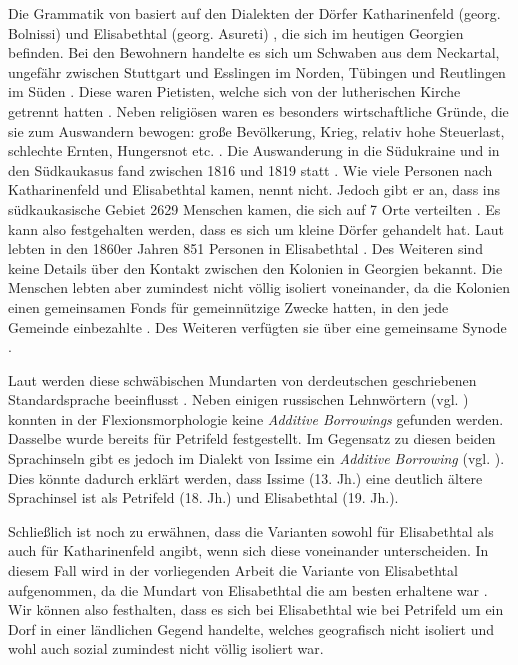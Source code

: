 Die Grammatik von \citet{Žirmunskij1928/29} basiert auf den Dialekten der Dörfer Katharinenfeld (georg. Bolnissi) und Elisabethtal (georg. Asureti) \citep[38]{Žirmunskij1928/29}, die sich im heutigen Georgien befinden. Bei den Bewohnern handelte es sich um Schwaben aus dem Neckartal, ungefähr zwischen Stuttgart und Esslingen im Norden, Tübingen und Reutlingen im Süden \citep[56]{Žirmunskij1928/29}. Diese waren Pietisten, welche sich von der lutherischen Kirche getrennt hatten \citep[39]{Žirmunskij1928/29}. Neben religiösen waren es besonders wirtschaftliche Gründe, die sie zum Auswandern bewogen: große Bevölkerung, Krieg, relativ hohe Steuerlast, schlechte Ernten, Hungersnot etc. \citep[41]{Žirmunskij1928/29}. Die Auswanderung in die Südukraine und in den Südkaukasus fand zwischen 1816 und 1819 statt \citep[39]{Žirmunskij1928/29}. Wie viele Personen nach Katharinenfeld und Elisabethtal kamen, nennt \citet{Žirmunskij1928/29} nicht. Jedoch gibt er an, dass ins südkaukasische Gebiet 2629 Menschen kamen, die sich auf 7 Orte verteilten \citep[42]{Žirmunskij1928/29}. Es kann also festgehalten werden, dass es sich um kleine Dörfer gehandelt hat. Laut \citet{Schrenk1997} lebten in den 1860er Jahren 851 Personen in Elisabethtal \citep[202–203]{Žirmunskij1928/29}. Des Weiteren sind keine Details über den Kontakt zwischen den Kolonien in Georgien bekannt. Die Menschen lebten aber zumindest nicht völlig isoliert voneinander, da die Kolonien einen gemeinsamen Fonds für gemeinnützige Zwecke hatten, in den jede Gemeinde einbezahlte \citep[198]{Schrenk1997}. Des Weiteren verfügten sie über eine gemeinsame Synode \citep[199]{Schrenk1997}.

Laut \citet{Žirmunskij1928/29} werden diese schwäbischen Mundarten von der\linebreak deutschen geschriebenen Standardsprache beeinflusst \citep[58]{Žirmunskij1928/29}. Neben einigen russischen Lehnwörtern (vgl. \citealt[52]{Žirmunskij1928/29}) konnten in der Flexionsmorphologie keine \textit{Additive Borrowings} gefunden werden. Dasselbe wurde bereits für Petrifeld festgestellt. Im Gegensatz zu diesen beiden Sprachinseln gibt es jedoch im Dialekt von Issime ein \textit{Additive Borrowing} (vgl. ). Dies könnte dadurch erklärt werden, dass Issime (13. Jh.) eine deutlich ältere Sprachinsel ist als Petrifeld (18. Jh.) und Elisabethtal (19. Jh.).

Schließlich ist noch zu erwähnen, dass \citet{Žirmunskij1928/29} die Varianten sowohl für Elisabethtal als auch für Katharinenfeld angibt, wenn sich diese voneinander unterscheiden. In diesem Fall wird in der vorliegenden Arbeit die Variante von Elisabethtal aufgenommen, da die Mundart von Elisabethtal die am besten erhaltene war \citep[58]{Žirmunskij1928/29}. Wir können also festhalten, dass es sich bei Elisabethtal wie bei Petrifeld um ein Dorf in einer ländlichen Gegend handelte, welches geografisch nicht isoliert und wohl auch sozial zumindest nicht völlig isoliert war.

